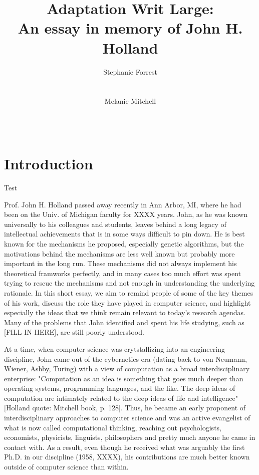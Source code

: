 \documentclass{sig-alternate}
\title{Adaptation Writ Large:\\ An essay in memory of John H. Holland}
\author 
{\alignauthor
 Stephanie Forrest\\
 \affaddr{University of New Mexico}\\
 \affaddr{Santa Fe Institute}\\
 \email{forrest@cs.unm.edu}
 \alignauthor
Melanie Mitchell \\
 \affaddr{Portland State University}\\
 \affaddr{Santa Fe Institute}\\
 \email{mm@pdx.edu}
}
\begin{document}
\maketitle

% 

\section{Introduction}
Test

Prof. John H. Holland passed away recently in Ann Arbor, MI, where he had been on the Univ. of Michigan faculty for XXXX years.  John, as he was known universally to his colleagues and students, 
leaves behind a long legacy of intellectual achievements that is in some ways difficult to pin down.   He is best known for the mechanisms he proposed, especially genetic algorithms, but the motivations behind the mechanisms are less well known but probably more important in the long run.  These mechanisms did not always implement his theoretical framworks perfectly, and in many cases too much effort was spent trying to rescue the mechanisms and not enough in understanding the underlying rationale.  In this short essay, we aim to remind people of some of the key themes of his work, discuss the role they have played in computer science, and highlight especially the ideas that we think remain relevant to today's research agendas.  Many of the problems that John identified and spent his life studying, such as [FILL IN HERE], are still poorly understood.

At a time, when computer science was crytstallizing into an engineering discipline, John came out of the cybernetics era (dating back to von Neumann, Wiener, Ashby, Turing) with a view of computation as a broad interdisciplinary enterprise: "Computation as an idea is something that goes much deeper than operating systems, programming languages, and the like.  The deep ideas of computation are intimately related to the deep ideas of life and intelligence" [Holland quote: Mitchell book, p. 128].  Thus, he became an early proponent of interdisciplinary approaches to computer science and was an active evangelist of what is now called computational thinking, reaching out psychologists, economists, physicists, linguists, philosophers and pretty much anyone he came in contact with.  As a result, even though he received what was arguably the first Ph.D. in our discipline (1958, XXXX), his contributions are much better known outside of computer science than within.
\end{document}
